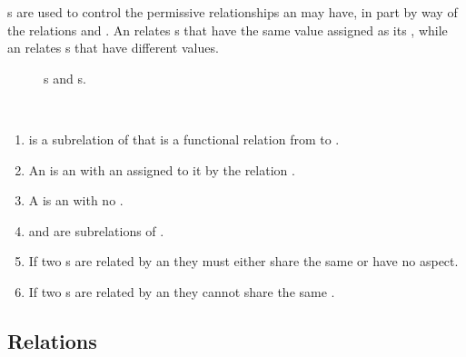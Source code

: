 s are used to control the permissive relationships an
 may have, in part by way of the  relations
 and .
%
An  relates s that have the same
value assigned as its , while an 
relates s that have different values.





\begin{figure}
\centering

\caption{\label{uml-aspectelement}
s and s.}
\end{figure}

\begin{axioms}~
  \begin{enumerate}[resume=axioms,{label=(\arabic*)}]
  \item {} is a subrelation of  that is a functional relation from  to
    .
  \item An  is an  with an 
    assigned to it by the relation .
  \item A  is an  with
    no .

  \item {} and  are subrelations of .
    
  \item If two s are related by an
     they must either share the same  or have no aspect.

  \item If two s are related by an  they cannot share the same .

  \end{enumerate}
\end{axioms}


\subsection{Relations}
\label{sec:relations}

